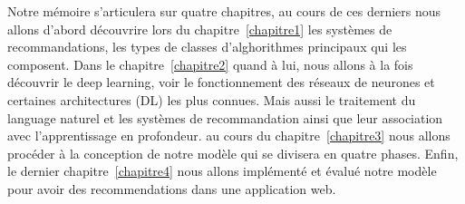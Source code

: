 \par Notre mémoire s'articulera sur quatre chapitres, au cours de ces derniers nous allons d'abord découvrire lors du chapitre~\ref{chapitre1} les systèmes de recommandations, les types de classes d'alghorithmes principaux qui les composent. Dans le chapitre~\ref{chapitre2} quand à lui, nous allons à la fois découvrir le deep learning, voir le fonctionnement des réseaux de neurones et certaines architectures (DL) les plus connues. Mais aussi le traitement du language naturel et les systèmes de recommandation ainsi que leur association avec l'apprentissage en profondeur. au cours du chapitre~\ref{chapitre3} nous allons procéder à la conception de notre modèle qui se divisera en quatre phases. Enfin, le dernier chapitre~\ref{chapitre4} nous allons implémenté et évalué notre modèle pour avoir des recommendations dans une application web.
